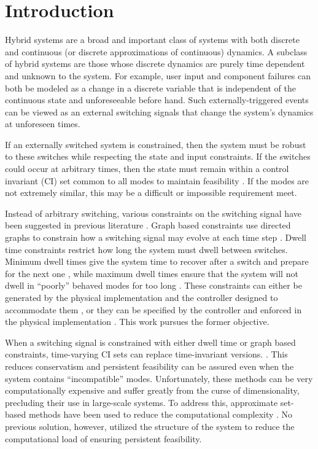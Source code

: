 \section{Introduction}
Hybrid systems are a broad and important class of systems with both discrete and continuous (or discrete approximations of continuous) dynamics. A subclass of hybrid systems are those whose discrete dynamics are purely time dependent and unknown to the system. For example, user input and component failures can both be modeled as a change in a discrete variable that is independent of the continuous state and unforeseeable before hand. Such externally-triggered events can be viewed as an external switching signals that change the system's dynamics at unforeseen times. 

If an externally switched system is constrained, then the system must be robust to these switches while respecting the state and input constraints. If the switches could occur at arbitrary times, then the state must remain within a control invariant (CI) set common to all modes to maintain feasibility \cite{Liberzon1999, Blanchini1999}. If the modes are not extremely similar, this may be a difficult or impossible requirement meet. 

Instead of arbitrary switching, various constraints on the switching signal have been suggested in previous literature \cite{Liberzon1999,Morse1999}. Graph based constraints use directed graphs to constrain how a switching signal may evolve at each time step \cite{Santis2004, Athanasopoulos2014, Athanasopoulos2017, Fiacchini2018}. Dwell time constraints restrict how long the system must dwell between switches. Minimum dwell times give the system time to recover after a switch and prepare for the next one \cite{Danielson2019,Lavaei2021}, while maximum dwell times ensure that the system will not dwell in ``poorly'' behaved modes for too long \cite{Hall2022}. These constraints can either be generated by the physical implementation and the controller designed to accommodate them \cite{Danielson2019}, or they can be specified by the controller and enforced in the physical implementation \cite{Zhang2016}. This work pursues the former objective.

When a switching signal is constrained with either dwell time or graph based constraints, time-varying CI sets can replace time-invariant versions. \cite{Danielson2019, Athanasopoulos2017}. This reduces conservatism and persistent feasibility can be assured even when the system contains ``incompatible'' modes. Unfortunately, these methods can be very computationally expensive and suffer greatly from the curse of dimensionality, precluding their use in large-scale systems. To address this, approximate set-based methods have been used to reduce the computational complexity \cite{Santis2004,Athanasopoulos2017}. No previous solution, however, utilized the structure of the system to reduce the computational load of ensuring persistent feasibility. 

